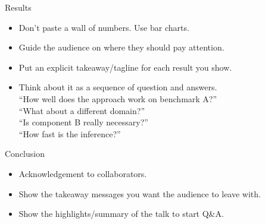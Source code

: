 \documentclass[usenames,dvipsnames,11pt,aspectratio=169]{beamer}
\begin{document}
\begin{frame}
    {Results}
    \begin{itemize}
        \item Don't paste a wall of numbers. Use bar charts.
        \item Guide the audience on where they should pay attention.
        \item Put an explicit takeaway/tagline for each result you show.
        \item Think about it as a sequence of question and answers.\\
            ``How well does the approach work on benchmark A?''\\
            ``What about a different domain?''\\
            ``Is component B really necessary?''\\
            ``How fast is the inference?''
    \end{itemize}
\end{frame}

\begin{frame}
    {Conclusion}
    \begin{itemize}
        \item Acknowledgement to collaborators.
        \item Show the takeaway messages you want the audience to leave with.
        \item Show the highlights/summary of the talk to start Q\&A. 
    \end{itemize}
\end{frame}
\end{document}
